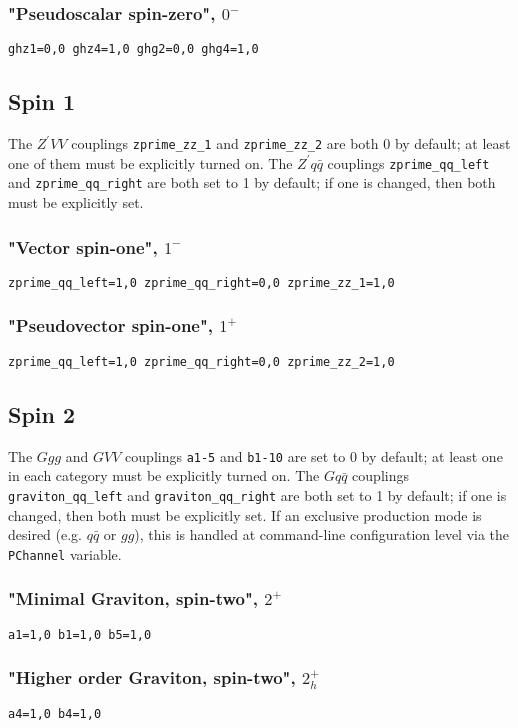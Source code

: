 \documentclass[aps,superscriptaddress,nofootinbib]{revtex4}
\begin{document}
\subsubsection{"Pseudoscalar spin-zero", \texorpdfstring{$0^-$}{0-}}
\verb|ghz1=0,0 ghz4=1,0 ghg2=0,0 ghg4=1,0|
\subsection{Spin 1}
The $Z^\prime VV$ couplings \verb|zprime_zz_1| and \verb|zprime_zz_2| are both 0 by default; at least one of them must be explicitly turned on.  The $Z^{\prime}q\bar{q}$ couplings \verb|zprime_qq_left| and \verb|zprime_qq_right| are both set to 1 by default; if one is changed, then both must be explicitly set.
\subsubsection{"Vector spin-one", \texorpdfstring{$1^-$}{1-}}
\verb|zprime_qq_left=1,0 zprime_qq_right=0,0 zprime_zz_1=1,0|
\subsubsection{"Pseudovector spin-one", \texorpdfstring{$1^+$}{1+}}
\verb|zprime_qq_left=1,0 zprime_qq_right=0,0 zprime_zz_2=1,0|
\subsection{Spin 2}
The $Ggg$ and $GVV$ couplings \verb|a1-5| and \verb|b1-10| are set to 0 by default; at least one in each category must be explicitly turned on.  The $Gq\bar{q}$ couplings \verb|graviton_qq_left| and \verb|graviton_qq_right| are both set to 1 by default; if one is changed, then both must be explicitly set.
If an exclusive production mode is desired (e.g. $q\bar{q}$ or $gg$), this is handled at command-line configuration level via the \verb|PChannel| variable.
\subsubsection{"Minimal Graviton, spin-two", \texorpdfstring{$2^+$}{2+}}
\verb|a1=1,0 b1=1,0 b5=1,0|
\subsubsection{"Higher order Graviton, spin-two", \texorpdfstring{$2^+_h$}{2+h}}
\verb|a4=1,0 b4=1,0|
\end{document}
